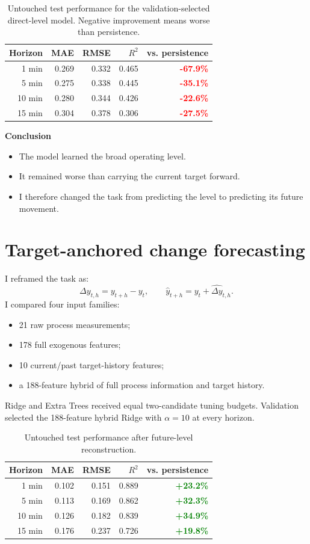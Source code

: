 \documentclass[10pt,a4paper]{article}
\newcommand{\good}[1]{\textcolor{Green}{\textbf{#1}}}
\newcommand{\bad}[1]{\textcolor{Red}{\textbf{#1}}}
\begin{document}
\begin{table}[ht]
\centering
\begin{tabular}{rrrrr}
\toprule
\textbf{Horizon} & \textbf{MAE} & \textbf{RMSE} & \textbf{$R^2$} & \textbf{vs. persistence} \\
\midrule
1 min & 0.269 & 0.332 & 0.465 & \bad{-67.9\%} \\
5 min & 0.275 & 0.338 & 0.445 & \bad{-35.1\%} \\
10 min & 0.280 & 0.344 & 0.426 & \bad{-22.6\%} \\
15 min & 0.304 & 0.378 & 0.306 & \bad{-27.5\%} \\
\bottomrule
\end{tabular}
\caption{Untouched test performance for the validation-selected direct-level model. Negative improvement means worse than persistence.}
\end{table}

\textbf{Conclusion}
\begin{itemize}
  \item The model learned the broad operating level.
  \item It remained worse than carrying the current target forward.
  \item I therefore changed the task from predicting the level to predicting its future movement.
\end{itemize}

\section{Target-anchored change forecasting}

I reframed the task as:
\[
\Delta y_{t,h}=y_{t+h}-y_t,
\qquad
\hat y_{t+h}=y_t+\widehat{\Delta y}_{t,h}.
\]
I compared four input families:
\begin{itemize}
  \item 21 raw process measurements;
  \item 178 full exogenous features;
  \item 10 current/past target-history features;
  \item a 188-feature hybrid of full process information and target history.
\end{itemize}
Ridge and Extra Trees received equal two-candidate tuning budgets. Validation selected the 188-feature hybrid Ridge with $\alpha=10$ at every horizon.

\begin{table}[ht]
\centering
\begin{tabular}{rrrrr}
\toprule
\textbf{Horizon} & \textbf{MAE} & \textbf{RMSE} & \textbf{$R^2$} & \textbf{vs. persistence} \\
\midrule
1 min & 0.102 & 0.151 & 0.889 & \good{+23.2\%} \\
5 min & 0.113 & 0.169 & 0.862 & \good{+32.3\%} \\
10 min & 0.126 & 0.182 & 0.839 & \good{+34.9\%} \\
15 min & 0.176 & 0.237 & 0.726 & \good{+19.8\%} \\
\bottomrule
\end{tabular}
\caption{Untouched test performance after future-level reconstruction.}
\end{table}
\end{document}
